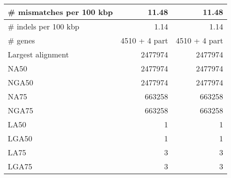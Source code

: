 \documentclass[12pt,a4paper]{article}
\begin{document}
\begin{table}[ht]
\begin{center}
\begin{tabular}{|l*{2}{|r}|}
\# mismatches per 100 kbp & 11.48 & 11.48 \\ \hline
\# indels per 100 kbp & 1.14 & 1.14 \\ \hline
\# genes & 4510 + 4 part & 4510 + 4 part \\ \hline
Largest alignment & 2477974 & 2477974 \\ \hline
NA50 & 2477974 & 2477974 \\ \hline
NGA50 & 2477974 & 2477974 \\ \hline
NA75 & 663258 & 663258 \\ \hline
NGA75 & 663258 & 663258 \\ \hline
LA50 & 1 & 1 \\ \hline
LGA50 & 1 & 1 \\ \hline
LA75 & 3 & 3 \\ \hline
LGA75 & 3 & 3 \\ \hline
\end{tabular}
\end{center}
\end{table}
\end{document}
